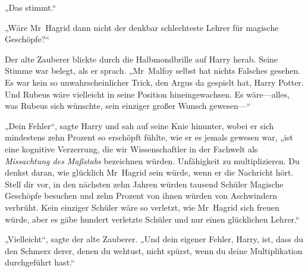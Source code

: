 „Das stimmt.“

„Wäre Mr~Hagrid dann nicht der denkbar schlechteste Lehrer für magische Geschöpfe?“

Der alte Zauberer blickte durch die Halbmondbrille auf Harry herab. Seine Stimme war belegt, als er sprach.
„Mr~Malfoy selbst hat nichts Falsches gesehen. Es war kein so unwahrscheinlicher Trick, den Argus da gespielt hat, Harry Potter. Und Rubeus wäre vielleicht in seine Position hineingewachsen. Es wäre—alles, was Rubeus sich wünschte, sein einziger großer Wunsch gewesen—“

„Dein Fehler“, sagte Harry und sah auf seine Knie hinunter, wobei er sich mindestens zehn Prozent so erschöpft fühlte, wie er es jemals gewesen war, „ist eine kognitive Verzerrung, die wir Wissenschaftler in der Fachwelt als \emph{Missachtung des Maßstabs} bezeichnen würden. Unfähigkeit zu multiplizieren. Du denkst daran, wie glücklich Mr~Hagrid sein würde, wenn er die Nachricht hört. Stell dir vor, in den nächsten zehn Jahren würden tausend Schüler Magische Geschöpfe besuchen und zehn Prozent von ihnen würden von Aschwindern verbrüht. Kein einziger Schüler wäre so verletzt, wie Mr~Hagrid sich freuen würde, aber es gäbe hundert verletzte Schüler und nur einen glücklichen Lehrer.“

„Vielleicht“, sagte der alte Zauberer.
„Und dein eigener Fehler, Harry, ist, dass du den Schmerz derer, denen du wehtust, nicht spürst, wenn du deine Multiplikation durchgeführt hast.“

